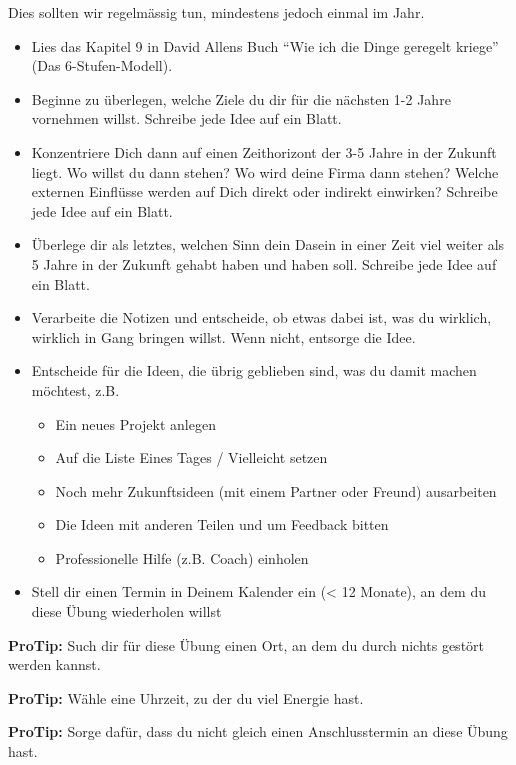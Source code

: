 \documentclass[
  ngerman,
  paper=a4,
,captions=tableheading
]{scrartcl}
\providecommand{\tightlist}{%
  \setlength{\itemsep}{0pt}\setlength{\parskip}{0pt}}
\begin{document}
Dies sollten wir regelmässig tun, mindestens jedoch einmal im Jahr.

\begin{itemize}
\tightlist
\item
  Lies das Kapitel 9 in David Allens Buch ``Wie ich die Dinge geregelt
  kriege'' (Das 6-Stufen-Modell).
\item
  Beginne zu überlegen, welche Ziele du dir für die nächsten 1-2 Jahre
  vornehmen willst. Schreibe jede Idee auf ein Blatt.
\item
  Konzentriere Dich dann auf einen Zeithorizont der 3-5 Jahre in der
  Zukunft liegt. Wo willst du dann stehen? Wo wird deine Firma dann
  stehen? Welche externen Einflüsse werden auf Dich direkt oder indirekt
  einwirken? Schreibe jede Idee auf ein Blatt.
\item
  Überlege dir als letztes, welchen Sinn dein Dasein in einer Zeit viel
  weiter als 5 Jahre in der Zukunft gehabt haben und haben soll.
  Schreibe jede Idee auf ein Blatt.
\item
  Verarbeite die Notizen und entscheide, ob etwas dabei ist, was du
  wirklich, wirklich in Gang bringen willst. Wenn nicht, entsorge die
  Idee.
\item
  Entscheide für die Ideen, die übrig geblieben sind, was du damit
  machen möchtest, z.B.

  \begin{itemize}
  \tightlist
  \item
    Ein neues Projekt anlegen
  \item
    Auf die Liste Eines Tages / Vielleicht setzen
  \item
    Noch mehr Zukunftsideen (mit einem Partner oder Freund) ausarbeiten
  \item
    Die Ideen mit anderen Teilen und um Feedback bitten
  \item
    Professionelle Hilfe (z.B. Coach) einholen
  \end{itemize}
\item
  Stell dir einen Termin in Deinem Kalender ein (\textless{} 12 Monate),
  an dem du diese Übung wiederholen willst
\end{itemize}

\textbf{ProTip:} Such dir für diese Übung einen Ort, an dem du durch
nichts gestört werden kannst.

\textbf{ProTip:} Wähle eine Uhrzeit, zu der du viel Energie hast.

\textbf{ProTip:} Sorge dafür, dass du nicht gleich einen Anschlusstermin
an diese Übung hast.
\end{document}
